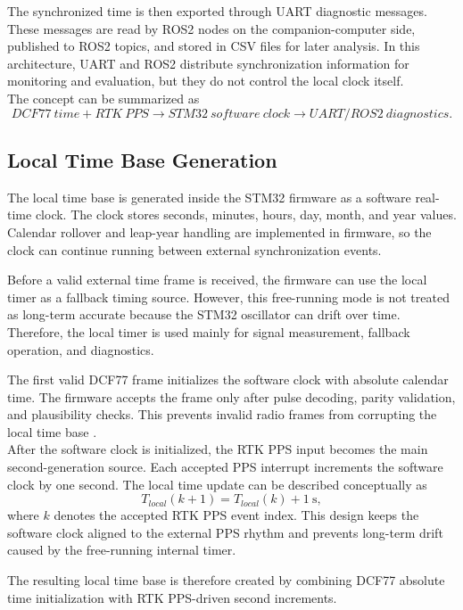 The synchronized time is then exported through UART diagnostic messages. These messages are read by ROS2 nodes on the companion-computer side, published to ROS2 topics, and stored in CSV files for later analysis. In this architecture, UART and ROS2 distribute synchronization information for monitoring and evaluation, but they do not control the local clock itself.
\\
The concept can be summarized as
\begin{equation}
DCF77~time + RTK~PPS \rightarrow STM32~software~clock \rightarrow UART/ROS2~diagnostics.
\end{equation}

\subsection{Local Time Base Generation}

The local time base is generated inside the STM32 firmware as a software real-time clock. The clock stores seconds, minutes, hours, day, month, and year values. Calendar rollover and leap-year handling are implemented in firmware, so the clock can continue running between external synchronization events.

Before a valid external time frame is received, the firmware can use the local timer as a fallback timing source. However, this free-running mode is not treated as long-term accurate because the STM32 oscillator can drift over time. Therefore, the local timer is used mainly for signal measurement, fallback operation, and diagnostics.

The first valid DCF77 frame initializes the software clock with absolute calendar time. The firmware accepts the frame only after pulse decoding, parity validation, and plausibility checks. This prevents invalid radio frames from corrupting the local time base \cite{ptbDcf77}.
\\
After the software clock is initialized, the RTK PPS input becomes the main second-generation source. Each accepted PPS interrupt increments the software clock by one second. The local time update can be described conceptually as
\begin{equation}
T_{local}(k+1) = T_{local}(k) + 1~\mathrm{s},
\end{equation}
where $k$ denotes the accepted RTK PPS event index. This design keeps the software clock aligned to the external PPS rhythm and prevents long-term drift caused by the free-running internal timer.

The resulting local time base is therefore created by combining DCF77 absolute time initialization with RTK PPS-driven second increments.

